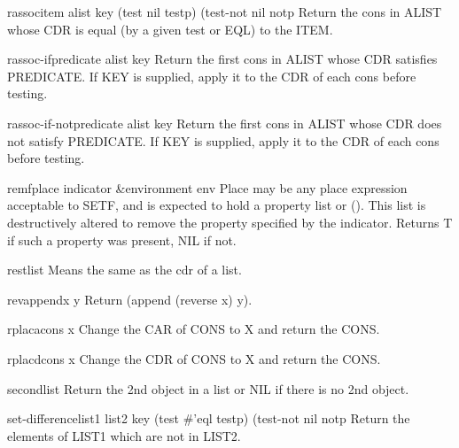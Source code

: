 \begin{function}{rassoc}{item alist \key key (test nil testp) (test-not nil notp}{}
  Return the cons in ALIST whose CDR is equal (by a given test or EQL) to
   the ITEM.
\end{function}

\begin{function}{rassoc-if}{predicate alist \key key}{}
  Return the first cons in ALIST whose CDR satisfies PREDICATE. If KEY
  is supplied, apply it to the CDR of each cons before testing.
\end{function}

\begin{function}{rassoc-if-not}{predicate alist \key key}{}
  Return the first cons in ALIST whose CDR does not satisfy PREDICATE.
  If KEY is supplied, apply it to the CDR of each cons before testing.
\end{function}

\begin{macro}{remf}{place indicator &environment env}{}
  Place may be any place expression acceptable to SETF, and is expected
  to hold a property list or (). This list is destructively altered to
  remove the property specified by the indicator. Returns T if such a
  property was present, NIL if not.
\end{macro}

\begin{accessor}{rest}{list}{}
  Means the same as the cdr of a list.
\end{accessor}

\begin{function}{revappend}{x y}{}
  Return (append (reverse x) y).
\end{function}

\begin{function}{rplaca}{cons x}{}
  Change the CAR of CONS to X and return the CONS.
\end{function}

\begin{function}{rplacd}{cons x}{}
  Change the CDR of CONS to X and return the CONS.
\end{function}

\begin{accessor}{second}{list}{}
  Return the 2nd object in a list or NIL if there is no 2nd object.
\end{accessor}

\begin{function}{set-difference}{list1 list2 \key key (test #'eql testp) (test-not nil notp}{}
  Return the elements of LIST1 which are not in LIST2.
\end{function}

